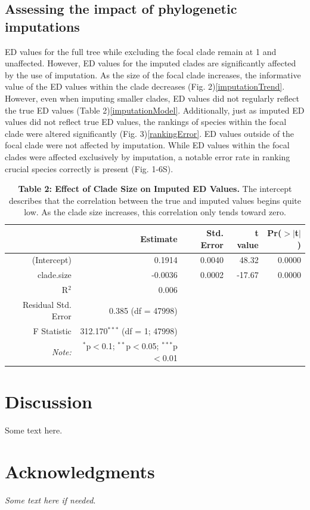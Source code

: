 \documentclass[12pt,english]{article}
\begin{document}
\subsection*{Assessing the impact of phylogenetic imputations}

ED values for the full tree while excluding the focal clade remain at
1 and unaffected. However, ED values for the imputed clades are
significantly affected by the use of imputation. As the size of the
focal clade increases, the informative value of the ED values within the clade 
decreases (Fig. 2)\ref{imputationTrend}. However, even when imputing smaller 
clades, ED values did not regularly reflect the true ED values (Table 2)\ref{imputationModel}.
Additionally, just as imputed ED values did not reflect true ED values, the rankings
of species within the focal clade were altered significantly (Fig. 3)\ref{rankingError}.
ED values outside of the focal clade were not affected by imputation.
While ED values within the focal clades were affected exclusively by imputation, 
a notable error rate in ranking crucial species correctly is present 
(Fig. 1-6S).  


\begin{table}[ht] 
\centering
\begin{tabular}{rrrrr}
  \hline
 & Estimate & Std. Error & t value & Pr($>$$|$t$|$) \\
  \hline
 (Intercept) & 0.1914 & 0.0040 & 48.32 & 0.0000 \\
   clade.size & -0.0036 & 0.0002 & -17.67 & 0.0000 \\
  \hline
  R$^{2}$ & 0.006 \\
  Residual Std. Error & 0.385 (df = 47998) \\
  F Statistic & 312.170$^{***}$ (df = 1; 47998) \\
  \hline
  \hline
\textit{Note:}  & \multicolumn{1}{r}{$^{*}$p$<$0.1; $^{**}$p$<$0.05; $^{***}$p$<$0.01} \\
\end{tabular}
\caption*{\textbf{Table 2: Effect of Clade Size on Imputed ED Values.} The 
intercept describes that the correlation between the true and imputed values 
begins quite low. As the clade size increases, this correlation only tends
toward zero.}
\end{table}

\section*{Discussion}
Some text here.

\section*{Acknowledgments}
\emph{Some text here if needed}.
\clearpage
\printbibliography
\end{document}
